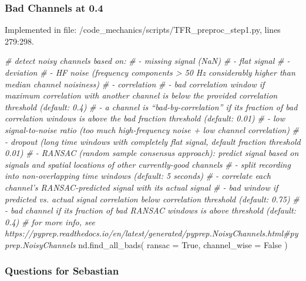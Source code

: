 \documentclass[
  man,floatsintext]{apa6}
\newenvironment{Shaded}{\begin{snugshade}}{\end{snugshade}}
\newcommand{\AttributeTok}[1]{\textcolor[rgb]{0.77,0.63,0.00}{#1}}
\newcommand{\CommentTok}[1]{\textcolor[rgb]{0.56,0.35,0.01}{\textit{#1}}}
\newcommand{\FunctionTok}[1]{\textcolor[rgb]{0.00,0.00,0.00}{#1}}
\newcommand{\NormalTok}[1]{#1}
\begin{document}
\hypertarget{bad-channels-at-0.4}{%
\subsubsection{Bad Channels at 0.4}\label{bad-channels-at-0.4}}

Implemented in file: /code\_mechanics/scripts/TFR\_preproc\_step1.py, lines 279:298.

\begin{Shaded}
\begin{Highlighting}[]
        \CommentTok{\# detect noisy channels based on:}
        \CommentTok{\# {-} missing signal (NaN)}
        \CommentTok{\# {-} flat signal}
        \CommentTok{\# {-} deviation}
        \CommentTok{\# {-} HF noise (frequency components \textgreater{} 50 Hz considerably higher than median channel noisiness)}
        \CommentTok{\# {-} correlation}
        \CommentTok{\#   {-} bad correlation window if maximum correlation with another channel is below the provided correlation threshold (default: 0.4)}
        \CommentTok{\#   {-} a channel is “bad{-}by{-}correlation” if its fraction of bad correlation windows is above the bad fraction threshold (default: 0.01)}
        \CommentTok{\# {-} low signal{-}to{-}noise ratio (too much high{-}frequency noise + low channel correlation)}
        \CommentTok{\# {-} dropout (long time windows with completely flat signal, default fraction threshold 0.01)}
        \CommentTok{\# {-} RANSAC (random sample consensus approach): predict signal based on signals and spatial locations of other currently{-}good channels}
        \CommentTok{\#   {-} split recording into non{-}overlapping time windows (default: 5 seconds)}
        \CommentTok{\#   {-} correlate each channel’s RANSAC{-}predicted signal with its actual signal}
        \CommentTok{\#   {-} bad window if predicted vs. actual signal correlation below correlation threshold (default: 0.75)}
        \CommentTok{\#   {-} bad channel if its fraction of bad RANSAC windows is above threshold (default: 0.4)}
        \CommentTok{\# for more info, see https://pyprep.readthedocs.io/en/latest/generated/pyprep.NoisyChannels.html\#pyprep.NoisyChannels}
        \FunctionTok{nd.find\_all\_bads}\NormalTok{(}
            \AttributeTok{ransac =}\NormalTok{ True, }
            \AttributeTok{channel\_wise =}\NormalTok{ False}
\NormalTok{            )}
\end{Highlighting}
\end{Shaded}

\hypertarget{questions-for-sebastian}{%
\subsubsection{Questions for Sebastian}\label{questions-for-sebastian}}
\end{document}

